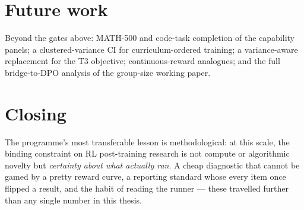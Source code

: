 \section{Future work}
Beyond the gates above: MATH-500 and code-task completion of the capability
panels; a clustered-variance CI for curriculum-ordered training; a
variance-aware replacement for the T3 objective; continuous-reward \ZVF{}
analogues; and the full bridge-to-DPO analysis of the group-size working
paper.

\section{Closing}
The programme's most transferable lesson is methodological: at this scale,
the binding constraint on RL post-training research is not compute or
algorithmic novelty but \emph{certainty about what actually ran}. A cheap
diagnostic that cannot be gamed by a pretty reward curve, a reporting standard
whose every item once flipped a result, and the habit of reading the runner
--- these travelled further than any single number in this thesis.
